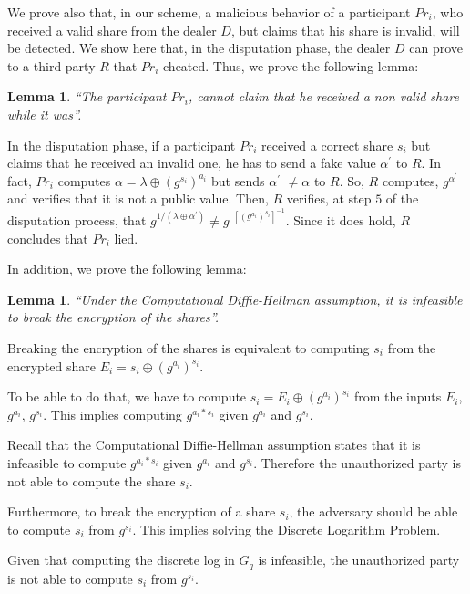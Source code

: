 \documentclass[submission,copyright,creativecommons]{eptcs}
\newtheorem{lemma}[theorem]{Lemma}
\newenvironment{proof}[1][Proof]{\begin{trivlist}
\item[\hskip \labelsep {\bfseries #1}]}{\end{trivlist}}
\begin{document}
We prove also that, in our scheme, a malicious behavior of a participant $Pr_{i}$, who received a valid share from the dealer $D$, but claims that his
share is invalid, will be detected. We show here that, in the disputation
phase, the dealer $D$ can prove to a third party $R$ that $Pr_{i}$ cheated. Thus, we prove the following lemma:

\begin{lemma}
\textquotedblleft The participant $Pr_{i}$, cannot claim that he received a
non valid share while it was\textquotedblright .
\end{lemma}

\begin{proof}
In the disputation phase, if a participant $Pr_{i}$ received a correct share $s_{i}$ but
claims that he received an invalid one, he has to send a fake value $\alpha
^{\prime }$ to $R$. In fact, $Pr_{i}$ computes $\alpha =\lambda \oplus
(g^{s_{i}})^{a_{i}}$ but sends $\alpha ^{\prime }$ $\neq \alpha $ to $R$.
So, $R$ computes, $g^{\alpha ^{\prime }}$ and verifies that it is not a
public value. Then, $R$ verifies, at step $5$ of the disputation process,
that $g^{1/(\lambda \oplus \alpha ^{\prime })}\neq g$ $^{[(g^{a_{i}})^{s_{i}}]^{-1}}$. Since it does hold, $R$ concludes that $Pr_{i}$ lied.
\end{proof}

In addition, we prove the following lemma:

\begin{lemma}
\textquotedblleft Under the Computational Diffie-Hellman assumption, it is
infeasible to break the encryption of the shares\textquotedblright .
\end{lemma}

\begin{proof}
Breaking the encryption of the shares is equivalent to computing $s_{i}$
from the encrypted share $E_{i}=s_{i}\oplus (g^{a_{i}})^{s_{i}}$. 

To be able to do that, we have to compute $s_{i}=E_{i}\oplus (g^{a_{i}})^{s_{i}}$ from
the inputs $E_{i}$, $g^{a_{i}}$, $g^{s_{i}}$. This implies computing $g^{a_{i}\ast s_{i}}$ given $g^{a_{i}}$ and $g^{s_{i}}$. 

Recall that the Computational Diffie-Hellman assumption states that it is infeasible to
compute $g^{a_{i}\ast s_{i}}$ given $g^{a_{i}}$ and $g^{s_{i}}$. Therefore
the unauthorized party is not able to compute the share $s_{i}$.

Furthermore, to break the encryption of a share $s_{i}$, the adversary
should be able to compute $s_{i}$ from $g^{s_{i}}$. This implies solving the
Discrete Logarithm Problem. 

Given that computing the discrete log in $G_{q}$
is infeasible, the unauthorized party is not able to compute $s_{i}$ from $g^{s_{i}}$.
\end{proof}
\end{document}
